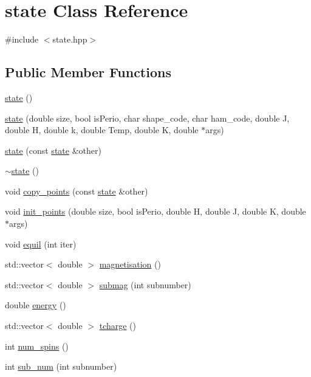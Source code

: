 \hypertarget{classstate}{}\section{state Class Reference}
\label{classstate}


{\ttfamily \#include $<$state.\+hpp$>$}

\subsection*{Public Member Functions}
\begin{DoxyCompactItemize}
\item 
\hyperlink{classstate_aee920d9f534640451f22b3525f9cb9de}{state} ()
\item 
\hyperlink{classstate_a1ffab1c19ca8140b1e41d9fa40bf3834}{state} (double size, bool is\+Perio, char shape\+\_\+code, char ham\+\_\+code, double J, double H, double k, double Temp, double K, double $\ast$args)
\item 
\hyperlink{classstate_a285d976cdbd4a9de9ec8d1d887991ecc}{state} (const \hyperlink{classstate}{state} \&other)
\item 
\hyperlink{classstate_a60216b51b01ca0ebe9786ec2da66568f}{$\sim$state} ()
\item 
void \hyperlink{classstate_a0d0ea6448509ececead44d83b4decd1c}{copy\+\_\+points} (const \hyperlink{classstate}{state} \&other)
\item 
void \hyperlink{classstate_a62fc1dbaf8ac5002ec6ca08ec93fb012}{init\+\_\+points} (double size, bool is\+Perio, double H, double J, double K, double $\ast$args)
\item 
void \hyperlink{classstate_af70b6f999313cc427a526388058cb45c}{equil} (int iter)
\item 
std\+::vector$<$ double $>$ \hyperlink{classstate_a5d5980e59b16063808f09eac46d14292}{magnetisation} ()
\item 
std\+::vector$<$ double $>$ \hyperlink{classstate_aff62d62706dc27dde2c3638769c0a00a}{submag} (int subnumber)
\item 
double \hyperlink{classstate_a6209503f752e5089e0301f103fdf1d1e}{energy} ()
\item 
std\+::vector$<$ double $>$ \hyperlink{classstate_aba4b4f47fc3b9cba97b5f63518214f30}{tcharge} ()
\item 
int \hyperlink{classstate_ad9182b875a7a3fb5981c811f7f062040}{num\+\_\+spins} ()
\item 
int \hyperlink{classstate_a8351befda232e04536d6a3e738754282}{sub\+\_\+num} (int subnumber)

\end{DoxyCompactItemize}
